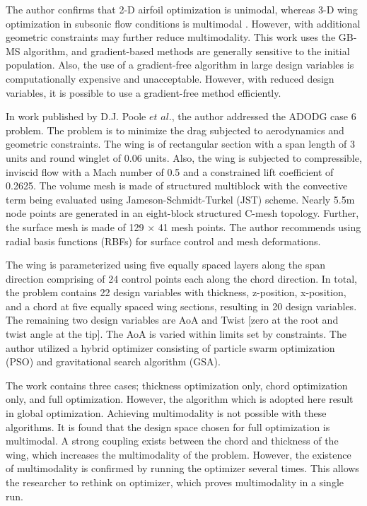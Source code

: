 The author confirms that 2-D airfoil optimization is unimodal, whereas 3-D wing optimization in subsonic flow conditions is multimodal \cite{oleg:phd}. However, with additional geometric constraints may further reduce multimodality. This work uses the GB-MS algorithm, and gradient-based methods are generally sensitive to the initial population. Also, the use of a gradient-free algorithm in large design variables is computationally expensive and unacceptable. However, with reduced design variables, it is possible to use a gradient-free method efficiently.


In work published by D.J. Poole \cite{Poole1} $et$ $al$., the author addressed the ADODG case 6 problem. The problem is to minimize the drag subjected to aerodynamics and geometric constraints. The wing is of rectangular section with a span length of 3 units and round winglet of 0.06 units. Also, the wing is subjected to compressible, inviscid flow with a Mach number of 0.5 and a constrained lift coefficient of 0.2625. The volume mesh is made of structured multiblock with the convective term being evaluated using Jameson-Schmidt-Turkel (JST) scheme. Nearly 5.5m node points are generated in an eight-block structured C-mesh topology. Further, the surface mesh is made of 129 $\times$ 41 mesh points. The author recommends using radial basis functions (RBFs) for surface control and mesh deformations.

The wing is parameterized using five equally spaced layers along the span direction comprising of 24 control points each along the chord direction. In total, the problem contains 22 design variables with thickness,  z-position, x-position, and a chord at five equally spaced wing sections, resulting in 20 design variables. The remaining two design variables are AoA and Twist [zero at the root and twist angle at the tip]. The AoA is varied within limits set by constraints. The author utilized a hybrid optimizer consisting of particle swarm optimization (PSO) and gravitational search algorithm (GSA). 

The work contains three cases; thickness optimization only, chord optimization only, and full optimization. However, the algorithm which is adopted here result in global optimization. Achieving multimodality is not possible with these algorithms. It is found that the design space chosen for full optimization is multimodal. A strong coupling exists between the chord and thickness of the wing, which increases the multimodality of the problem. However, the existence of multimodality is confirmed by running the optimizer several times. This allows the researcher to rethink on optimizer, which proves multimodality in a single run.


